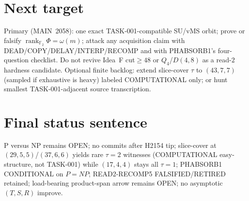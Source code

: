 \documentclass[11pt]{article}
\begin{document}
\section*{Next target}
Primary (MAIN~2058): one exact TASK-001-compatible SU/vMS orbit; prove or falsify
$\operatorname{rank}_{\mathbb F_2}\Phi=\omega(m)$; attack any acquisition claim with
DEAD/COPY/DELAY/INTERP/RECOMP and with PHABSORB1's four-question checklist.
Do not revive Idea~F cut$\ge48$ or $Q_4$/$D(4,8)$ as a read-$2$ hardness candidate.
Optional finite backlog: extend slice-cover $\tau$ to $(43,7,7)$ (sampled if exhaustive is heavy)
labeled COMPUTATIONAL only; or hunt smallest TASK-001-adjacent source transcription.

\section*{Final status sentence}
P versus NP remains OPEN; no commits after H2154 tip; slice-cover at $(29,5,5)$/$(37,6,6)$
yields rare $\tau{=}2$ witnesses (COMPUTATIONAL easy-structure, not TASK-001) while
$(17,4,4)$ stays all $\tau{=}1$; PHABSORB1 CONDITIONAL on $P=NP$; READ2-RECOMP5
FALSIFIED/RETIRED retained; load-bearing product-span arrow remains OPEN; no asymptotic
$(T,S,R)$ improve.
\end{document}
